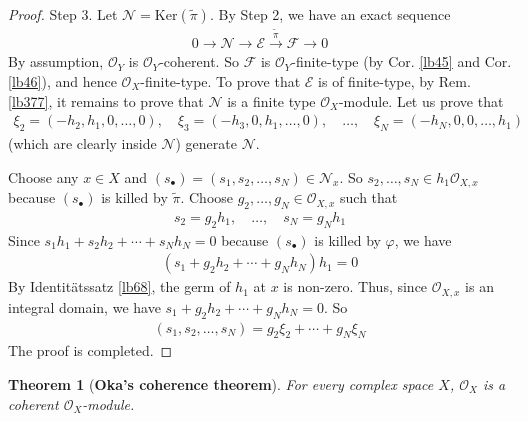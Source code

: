 \documentclass[12pt,b5paper,notitlepage]{report}
\theoremstyle{definition}
\theoremstyle{plain}
\newtheorem{thm}[df]{Theorem}
\newcommand{\wtd}{\widetilde}
\newcommand{\scr}{\mathscr}
\newcommand{\blt}{\bullet}
\newcommand{\Ker}{\mathrm{Ker}}
\numberwithin{equation}{section}
\begin{document}
\begin{proof}
Step 3. Let $\scr N=\Ker(\wtd\pi)$. By Step 2, we have an exact sequence
\begin{align*}
0\rightarrow\scr N\rightarrow\scr E\xrightarrow{\wtd\pi}\scr F\rightarrow0
\end{align*}
By assumption, $\scr O_Y$ is $\scr O_Y$-coherent. So $\scr F$ is $\scr O_Y$-finite-type (by Cor. \ref{lb45} and Cor. \ref{lb46}), and hence $\scr O_X$-finite-type. To prove that $\scr E$ is of finite-type, by Rem. \ref{lb377}, it remains to prove that $\scr N$ is a finite type $\scr O_X$-module. Let us prove that
\begin{align*}
\xi_2=(-h_2,h_1,0,\dots,0),\quad\xi_3=(-h_3,0,h_1,\dots,0),\quad\dots,\quad\xi_N=(-h_N,0,0,\dots,h_1)
\end{align*}
(which are clearly inside $\scr N$) generate $\scr N$.

Choose any $x\in X$ and $(s_\blt)=(s_1,s_2,\dots,s_N)\in\scr N_x$. So $s_2,\dots,s_N\in h_1\scr O_{X,x}$ because $(s_\blt)$ is killed by $\wtd\pi$. Choose $g_2,\dots,g_N\in\scr O_{X,x}$ such that
\begin{align*}
s_2=g_2h_1,\quad\dots,\quad s_N=g_Nh_1
\end{align*}
Since $s_1h_1+s_2h_2+\cdots+s_Nh_N=0$ because $(s_\blt)$ is killed by $\varphi$, we have
\begin{align*}
(s_1+g_2h_2+\cdots+g_Nh_N)h_1=0
\end{align*}  
By Identit\"atssatz \ref{lb68}, the germ of $h_1$ at $x$ is non-zero. Thus, since $\scr O_{X,x}$ is an integral domain, we have $s_1+g_2h_2+\cdots+g_Nh_N=0$. So
\begin{align*}
(s_1,s_2,\dots,s_N)=g_2\xi_2+\cdots+g_N\xi_N
\end{align*}
The proof is completed.
\end{proof}



\begin{thm}[\textbf{Oka's coherence theorem}]\label{lb86}
For every complex space $X$, $\scr O_X$ is a coherent $\scr O_X$-module.
\end{thm}
\end{document}
